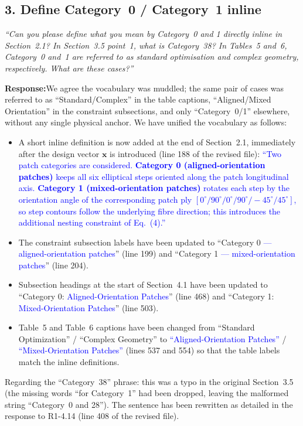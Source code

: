 \documentclass[11pt,a4paper]{article}
\newcommand{\new}[1]{\textcolor{blue}{#1}}
\newcommand{\rev}[1]{\par\noindent\textit{\small #1}\par\smallskip}
\newcommand{\resp}{\par\noindent\textbf{Response:}\space}
\begin{document}
\subsection*{3. Define Category~0 / Category~1 inline}
\rev{``Can you please define what you mean by Category~0 and 1 directly inline in Section~2.1? In Section~3.5 point~1, what is Category~38? In Tables~5 and~6, Category~0 and~1 are referred to as standard optimisation and complex geometry, respectively. What are these cases?''}
\resp We agree the vocabulary was muddled; the same pair of cases was referred to as ``Standard/Complex'' in the table captions, ``Aligned/Mixed Orientation'' in the constraint subsections, and only ``Category~0/1'' elsewhere, without any single physical anchor. We have unified the vocabulary as follows:
\begin{itemize}
    \item A short inline definition is now added at the end of Section~2.1, immediately after the design vector $\mathbf{x}$ is introduced (line 188 of the revised file): \new{``Two patch categories are considered. \textbf{Category 0 (aligned-orientation patches)} keeps all six elliptical steps oriented along the patch longitudinal axis. \textbf{Category 1 (mixed-orientation patches)} rotates each step by the orientation angle of the corresponding patch ply $[0^\circ/90^\circ/0^\circ/90^\circ/-45^\circ/45^\circ]$, so step contours follow the underlying fibre direction; this introduces the additional nesting constraint of Eq.~(4).''}
    \item The constraint subsection labels have been updated to ``Category 0 \new{--- aligned-orientation patches}'' (line 199) and ``Category 1 \new{--- mixed-orientation patches}'' (line 204).
    \item Subsection headings at the start of Section~4.1 have been updated to ``Category 0: \new{Aligned-Orientation Patches}'' (line 468) and ``Category 1: \new{Mixed-Orientation Patches}'' (line 503).
    \item Table~5 and Table~6 captions have been changed from ``Standard Optimization'' / ``Complex Geometry'' to \new{``Aligned-Orientation Patches''} / \new{``Mixed-Orientation Patches''} (lines 537 and 554) so that the table labels match the inline definitions.
\end{itemize}
Regarding the ``Category~38'' phrase: this was a typo in the original Section~3.5 (the missing words ``for Category~1'' had been dropped, leaving the malformed string ``Category~0 and 28''). The sentence has been rewritten as detailed in the response to R1-4.14 (line 408 of the revised file).
\end{document}
